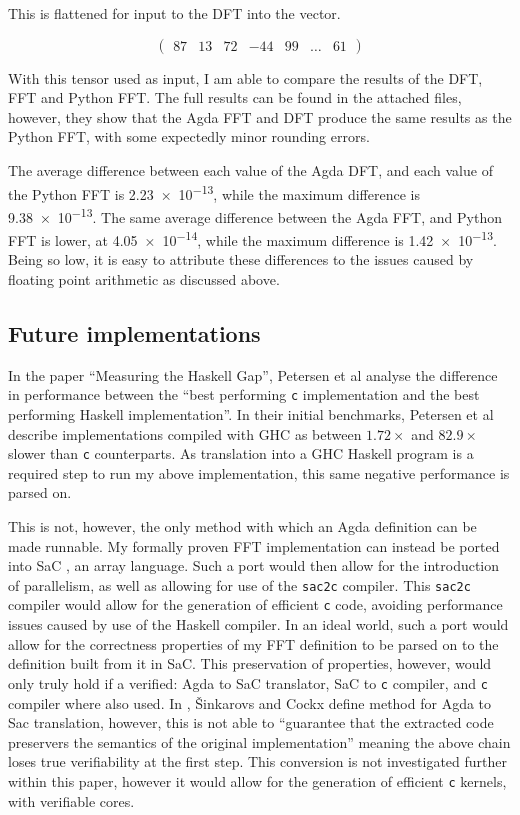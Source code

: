 This is flattened for input to the DFT into the vector.

\[
\begin{pmatrix}
   87  &  13 &  72 & -44 & 99  &  \dots   &  61 
\end{pmatrix}
\]

With this tensor used as input, I am able to compare the results of the DFT,
FFT and Python FFT. 
The full results can be found in the attached files, however, they show that the
Agda FFT and DFT produce the same results as the Python FFT, with some expectedly
minor rounding errors.

The average difference between each value of the Agda DFT, and each value of 
the Python FFT is \num{2.23e-13}, while the maximum difference is \num{9.38e-13}.
The same average difference between the Agda FFT, and Python FFT is lower, at 
\num{4.05e-14}, while the maximum difference is \num{1.42e-13}.
Being so low, it is easy to attribute these differences to the issues 
caused by floating point arithmetic as discussed above.

\subsection{Future implementations}

In the paper ``Measuring the Haskell Gap'', Petersen 
et al analyse the difference in performance between the ``best performing 
\verb|c| implementation and the best performing Haskell implementation''.\cite{PetersenHaskell}
In their initial benchmarks, Petersen et al describe implementations compiled
with GHC as between $1.72\times$ and $82.9\times$ slower than \verb|c| counterparts.\cite{PetersenHaskell}
As translation into a GHC Haskell program is a required step to run my above implementation,
this same negative performance is parsed on.

This is not, however, the only method with which an Agda definition can be
made runnable.
My formally proven FFT implementation can instead be ported into SaC
\cite{ScholzSac}, an array language.
Such a port would then allow for the introduction of parallelism, as well as
allowing for use of the \verb|sac2c| compiler.
This \verb|sac2c| compiler would allow for the generation of efficient \verb|c|
code, avoiding performance issues caused by use of the Haskell compiler.
In an ideal world, such a port would allow for the correctness properties of my 
FFT definition to be parsed on to the definition built from it in SaC.
This preservation of properties, however, would only truly hold if a verified:
Agda to SaC translator, SaC to \verb|c| compiler, and \verb|c| compiler where 
also used.\cite{ChoosingIsLosing}\cite{BlockedSinkarovs}
In \cite{ChoosingIsLosing}, Šinkarovs and Cockx define method for Agda to Sac 
translation, however, this is not able to ``guarantee that the extracted code 
preservers the semantics of the original implementation''\cite{ChoosingIsLosing}
meaning the above chain loses true verifiability at the first step.
This conversion is not investigated further within this paper, however it would
allow for the generation of efficient \verb|c| kernels, with verifiable cores.

